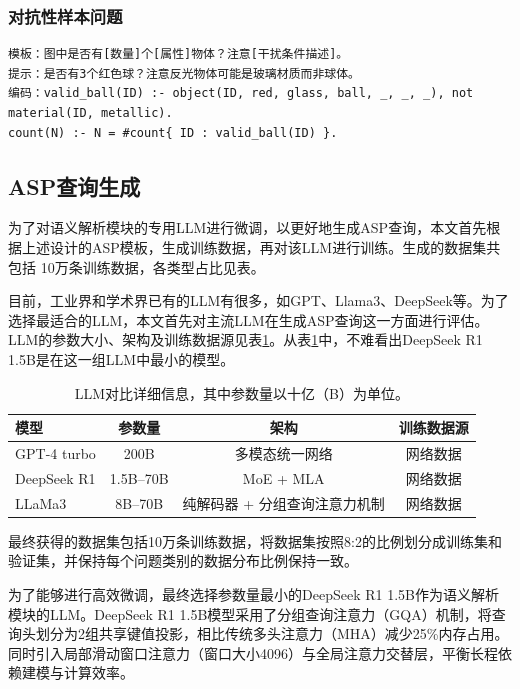 \subsubsection{对抗性样本问题}
\begin{lstlisting}
模板：图中是否有[数量]个[属性]物体？注意[干扰条件描述]。
提示：是否有3个红色球？注意反光物体可能是玻璃材质而非球体。
编码：valid_ball(ID) :- object(ID, red, glass, ball, _, _, _), not material(ID, metallic). 
count(N) :- N = #count{ ID : valid_ball(ID) }.
\end{lstlisting}

\subsection{ASP查询生成}
为了对语义解析模块的专用LLM进行微调，以更好地生成ASP查询，本文首先根据上述设计的ASP模板，生成训练数据，再对该LLM进行训练。生成的数据集共包括
10万条训练数据，各类型占比见表。

目前，工业界和学术界已有的LLM有很多，如GPT、Llama3、DeepSeek等。为了选择最适合的LLM，本文首先对主流LLM在生成ASP查询这一方面进行评估。
LLM的参数大小、架构及训练数据源见表\ref{tab:llm-comparison}。从表\ref{tab:llm-comparison}中，不难看出DeepSeek R1 1.5B是在这一组LLM中最小的模型。

\begin{table}[ht]
    \centering
    \begin{tabular}{lccc}
        \toprule
        \textbf{模型} & \textbf{参数量} & \textbf{架构} & \textbf{训练数据源} \\
        \midrule
        GPT-4 turbo    & 200B      & 多模态统一网络           & 网络数据         \\
        DeepSeek R1       & 1.5B--70B      & MoE + MLA            & 网络数据    \\
        LLaMa3         & 8B--70B   & 纯解码器 + 分组查询注意力机制   & 网络数据         \\
        \bottomrule
    \end{tabular}
    \caption{LLM对比详细信息，其中参数量以十亿（B）为单位。}
    \label{tab:llm-comparison}
\end{table}

最终获得的数据集包括10万条训练数据，将数据集按照8:2的比例划分成训练集和验证集，并保持每个问题类别的数据分布比例保持一致。

为了能够进行高效微调，最终选择参数量最小的DeepSeek R1 1.5B作为语义解析模块的LLM。DeepSeek R1 1.5B模型采用了分组查询注意力（GQA）机制，将查询头划分为2组共享键值投影，相比传统多头注意力（MHA）减少25\%内存占用。
同时引入局部滑动窗口注意力（窗口大小4096）与全局注意力交替层，平衡长程依赖建模与计算效率。

